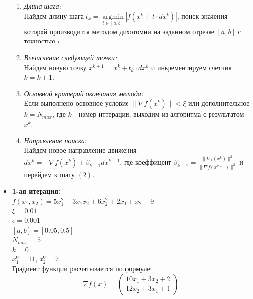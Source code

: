 \begin{itemize}
\begin{enumerate}
        \item {\it Длина шага:}\\
        	Найдем длину шага $t_k = \underset{t \in [a, b]}{\operatorname{argmin}}|f(x^k + t \cdot dx^k)|$, поиск значения которой производится методом дихотомии на заданном отрезке $[a, b]$ с точностью $\epsilon$.
        
        \item {\it Вычисление следующей точки:}\\
        	Найдем новую точку $x^{k + 1} = x^k + t_k \cdot dx^k$ и инкрементируем счетчик $k = k + 1$.
        
        \item {\it Основной критерий окончания метода:}\\
        	Если выполнено основное условие $\|\nabla f(x^k)\| < \xi$ или дополнительное $k = N_{max}$, где $k$ - номер иттерации, выходим из алгоритма с результатом $x^k$.
        
        \item {\it Направление поиска:}\\
        	Найдем новое направление движения \\ $dx^k = -\nabla f(x^k) + \beta_{k-1}dx^{k-1}$, где коеффицент $\beta_{k-1} = \displaystyle\frac{\|\nabla f(x^k)\|^2}{\|\nabla f(x^{k-1})\|^2}$ и перейдем к шагу $(2)$.
        
    \end{enumerate} 
    
    
    \item {\bfseries 1-ая итерация:} \\
    $f(x_1, x_2) = 5x^{2}_{1} + 3x_{1}x_{2} + 6x^{2}_{2} + 2x_1 + x_2 + 9$ \\ 
    $\xi = 0.01$\\
    $\epsilon = 0.001$\\
    $[a, b] = [0.05, 0.5]$\\
    $N_{max} = 5$\\
    $k = 0$ \\
    $x^{0}_1 = 11$, $x^{0}_2 = 7$ \\
    
    Градиент функции расчитывается по формуле:\\
    \begin{equation*}
    \nabla f(x) = \left(
    \begin{array}{cccc}
        10x_1 + 3x_2 + 2\\
        12x_2 + 3x_1 + 1
    \end{array}
    \right) 
    \end{equation*} \\
    

\end{itemize}
